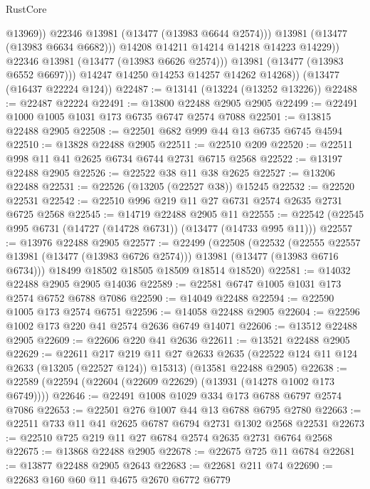 \begin{lexlean}{RustCore}
\begin{coremodule}
                        @13969))
                    @22346
                    @13981
                    (@13477 (@13983 @6644 @2574)))
                  @13981
                  (@13477 (@13983 @6634 @6682)))
                @14208
                @14211
                @14214
                @14218
                @14223
                @14229))
            @22346
            @13981
            (@13477 (@13983 @6626 @2574)))
          @13981
          (@13477 (@13983 @6552 @6697)))
        @14247
        @14250
        @14253
        @14257
        @14262
        @14268))
    (@13477 (@16437 @22224 @124))
@22487 := @13141 (@13224 (@13252 @13226))
@22488 := @22487 @22224
@22491 := @13800 @22488 @2905 @2905
@22499 := @22491 @1000 @1005 @1031 @173 @6735 @6747 @2574 @7088
@22501 := @13815 @22488 @2905
@22508 := @22501 @682 @999 @44 @13 @6735 @6745 @4594
@22510 := @13828 @22488 @2905
@22511 := @22510 @209
@22520 := @22511 @998 @11 @41 @2625 @6734 @6744 @2731 @6715 @2568
@22522 := @13197 @22488 @2905
@22526 := @22522 @38 @11 @38 @2625
@22527 := @13206 @22488
@22531 := @22526 (@13205 (@22527 @38)) @15245
@22532 := @22520 @22531
@22542 := @22510 @996 @219 @11 @27 @6731 @2574 @2635 @2731 @6725 @2568
@22545 := @14719 @22488 @2905 @11
@22555 := @22542 (@22545 @995 @6731 (@14727 (@14728 @6731)) (@13477 (@14733 @995 @11)))
@22557 := @13976 @22488 @2905
@22577 := @22499
    (@22508
      (@22532
        (@22555 @22557 @13981 (@13477 (@13983 @6726 @2574)))
        @13981
        (@13477 (@13983 @6716 @6734)))
      @18499
      @18502
      @18505
      @18509
      @18514
      @18520)
@22581 := @14032 @22488 @2905 @2905 @14036
@22589 := @22581 @6747 @1005 @1031 @173 @2574 @6752 @6788 @7086
@22590 := @14049 @22488
@22594 := @22590 @1005 @173 @2574 @6751
@22596 := @14058 @22488 @2905
@22604 := @22596 @1002 @173 @220 @41 @2574 @2636 @6749 @14071
@22606 := @13512 @22488 @2905
@22609 := @22606 @220 @41 @2636
@22611 := @13521 @22488 @2905
@22629 := @22611
    @217
    @219
    @11
    @27
    @2633
    @2635
    (@22522 @124 @11 @124 @2633 (@13205 (@22527 @124)) @15313)
    (@13581 @22488 @2905)
@22638 := @22589 (@22594 (@22604 (@22609 @22629) (@13931 (@14278 @1002 @173 @6749))))
@22646 := @22491 @1008 @1029 @334 @173 @6788 @6797 @2574 @7086
@22653 := @22501 @276 @1007 @44 @13 @6788 @6795 @2780
@22663 := @22511 @733 @11 @41 @2625 @6787 @6794 @2731 @1302 @2568 @22531
@22673 := @22510 @725 @219 @11 @27 @6784 @2574 @2635 @2731 @6764 @2568
@22675 := @13868 @22488 @2905
@22678 := @22675 @725 @11 @6784
@22681 := @13877 @22488 @2905 @2643
@22683 := @22681 @211 @74
@22690 := @22683 @160 @60 @11 @4675 @2670 @6772 @6779

\end{coremodule}
\end{lexlean}
